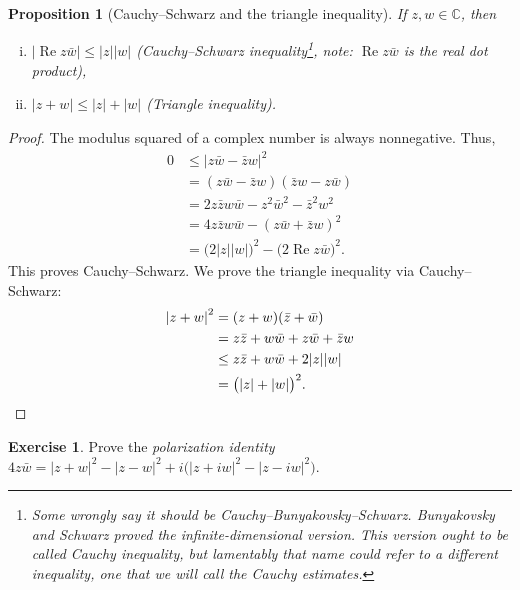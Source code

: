 \documentclass[12pt,openany]{book}
\renewcommand{\Re}{\operatorname{Re}}
\newcommand{\sabs}[1]{\lvert {#1} \rvert}
\newcommand{\C}{{\mathbb{C}}}
\newcommand{\myindex}[1]{#1\index{#1}}
\theoremstyle{plain}
\newtheorem{prop}[thm]{Proposition}
\theoremstyle{remark}
\theoremstyle{definition}
\newenvironment{exbox}{%
    \def\FrameCommand{\vrule width 1pt \relax\hspace{10pt}}%
    \MakeFramed{\advance\hsize-\width\FrameRestore}%
}{%
    \endMakeFramed
}
\theoremstyle{exercise}
\newtheorem{exercise}{Exercise}[section]
\theoremstyle{example}
\begin{document}
\begin{prop}[Cauchy--Schwarz and the triangle inequality]
If $z,w \in \C$, then
\begin{enumerate}[(i)]
\item
$\sabs{\Re z\bar{w}} \leq \sabs{z} \sabs{w}$ \quad (Cauchy--Schwarz inequality\footnote{%
Some wrongly say it should be Cauchy--Bunyakovsky--Schwarz.
Bunyakovsky and Schwarz proved the infinite-dimensional version.
This version ought to be called
Cauchy inequality, but lamentably that name could refer to a different
inequality, one that we will call the Cauchy estimates.}, note: $\Re z
\bar{w}$ is the real dot product),
\item
$\sabs{z+w} \leq \sabs{z} + \sabs{w}$ \quad (Triangle inequality).%
\end{enumerate}
\end{prop}

\begin{proof}
The modulus squared of a complex number is always nonnegative.
Thus,
\begin{equation*}
\begin{split}
0 & \leq {\sabs{z\bar{w}-\bar{z}w}}^2 \\
  & =    (z\bar{w}-\bar{z}w)(\bar{z}w-z\bar{w}) \\
  & =    2z\bar{z}w\bar{w} - z^2\bar{w}^2 - \bar{z}^2w^2 \\
  & =    4z\bar{z}w\bar{w} - {(z\bar{w}+\bar{z}w)}^2 \\
  & =    {\bigl(2\sabs{z}\sabs{w}\bigr)}^2 - {\bigl(2 \Re z\bar{w}\bigr)}^2 .
\end{split}
\end{equation*}
This proves Cauchy--Schwarz.  We prove the triangle inequality
via Cauchy--Schwarz:
\begin{equation*}
\begin{split}
{\sabs{z+w}}^2 & =    (z+w)(\bar{z}+\bar{w}) \\
               & =    z\bar{z} + w\bar{w} + z\bar{w} + \bar{z}w \\
               & \leq z\bar{z} + w\bar{w} + 2 \sabs{z}\sabs{w} \\
               & =    {\bigl(\sabs{z}+\sabs{w}\bigr)}^2 . \qedhere
\end{split}
\end{equation*}
\end{proof}

\begin{exbox}
\begin{exercise}
Prove the \emph{\myindex{polarization identity}}
$4 z\bar{w} =
{\sabs{z+w}}^2-{\sabs{z-w}}^2 +i \bigl( {\sabs{z+iw}}^2 - {\sabs{z-iw}}^2 \bigr)$.
\end{exercise}
\end{exbox}
\end{document}
